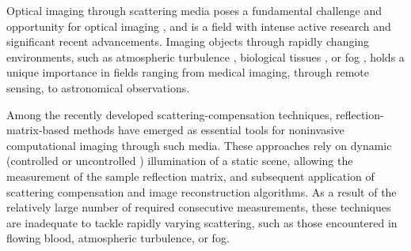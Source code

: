 \documentclass[pdflatex,sn-mathphys-num]{sn-jnl}%
\theoremstyle{thmstyleone}%
\theoremstyle{thmstyletwo}%
\theoremstyle{thmstylethree}%
\begin{document}
Optical imaging through scattering media poses a fundamental challenge and opportunity for optical imaging \cite{yoon2020deep,bertolotti2022imaging}, and is a field with intense active research and significant recent advancements. 
Imaging objects through rapidly changing environments, such as atmospheric turbulence \cite{mao2022single,cai2023convrt,zhang2024imaging}, biological tissues \cite{jang2015relation,horstmeyer2015guidestar}, or fog \cite{satat2018towards}, holds a unique importance in fields ranging from medical imaging, through remote sensing, to astronomical observations.

Among the recently developed scattering-compensation techniques, reflection-matrix-based methods have emerged as essential tools for noninvasive computational imaging through such media. These approaches rely on dynamic (controlled \cite{kang17,badon2020distortion,zhang2023deep,lim2024multiphoton} or uncontrolled \cite{lee22,weinberg2023noninvasive,sunray2024beyond}) illumination of a static scene, allowing the measurement of the sample reflection matrix, and subsequent application of scattering compensation and image reconstruction algorithms. As a result of the relatively large number of required consecutive measurements, these techniques are inadequate to tackle rapidly varying scattering, such as those encountered in flowing blood, atmospheric turbulence, or fog.
\end{document}
